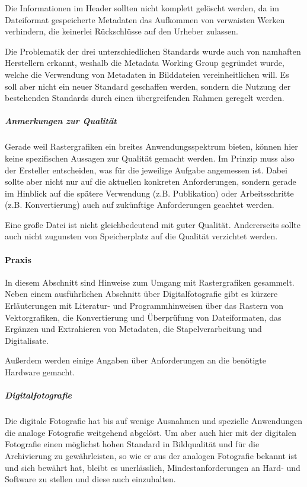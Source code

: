 Die Informationen im Header sollten nicht komplett gelöscht werden, da im Dateiformat gespeicherte Metadaten das Aufkommen von verwaisten Werken verhindern, die keinerlei Rückschlüsse auf den Urheber zulassen.

Die Problematik der drei unterschiedlichen Standards wurde auch von namhaften Herstellern erkannt, weshalb die Metadata Working Group gegründet wurde, welche die Verwendung von Metadaten in Bilddateien vereinheitlichen will. Es soll aber nicht ein neuer Standard geschaffen werden, sondern die Nutzung der bestehenden Standards durch einen übergreifenden Rahmen geregelt werden.


\subparagraph{Anmerkungen zur Qualität} Gerade weil Rastergrafiken ein breites Anwendungsspektrum bieten, können hier keine spezifischen Aussagen zur Qualität gemacht werden. Im Prinzip muss also der Ersteller entscheiden, was für die jeweilige Aufgabe angemessen ist. Dabei sollte aber nicht nur auf die aktuellen konkreten Anforderungen, sondern gerade im Hinblick auf die spätere Verwendung (z.B. Publikation) oder Arbeitsschritte (z.B. Konvertierung) auch auf zukünftige Anforderungen geachtet werden.

Eine große Datei ist nicht gleichbedeutend mit guter Qualität. Andererseits sollte auch nicht zugunsten von Speicherplatz auf die Qualität verzichtet werden.


\paragraph{Praxis}
In diesem Abschnitt sind Hinweise zum Umgang mit Rastergrafiken gesammelt. Neben einem ausführlichen Abschnitt über Digitalfotografie gibt es kürzere Erläuterungen mit Literatur- und Programmhinweisen über das Rastern von Vektorgrafiken, die Konvertierung und Überprüfung von Dateiformaten, das Ergänzen und Extrahieren von Metadaten, die Stapelverarbeitung und Digitalisate. 

Außerdem werden einige Angaben über Anforderungen an die benötigte Hardware gemacht.

\subparagraph{Digitalfotografie} Die digitale Fotografie hat bis auf wenige Ausnahmen und spezielle Anwendungen die analoge Fotografie weitgehend abgelöst. Um aber auch hier mit der digitalen Fotografie einen möglichst hohen Standard in Bildqualität und für die Archivierung zu gewährleisten, so wie er aus der analogen Fotografie bekannt ist und sich bewährt hat, bleibt es unerlässlich, Mindestanforderungen an Hard- und Software zu stellen und diese auch einzuhalten. 

